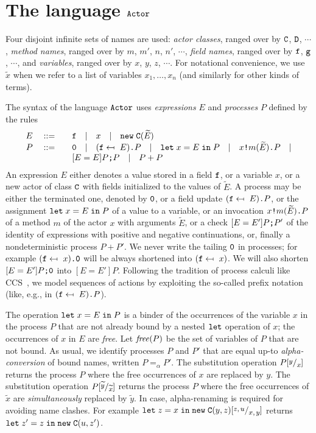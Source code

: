 \documentclass{LMCS}
\theoremstyle{plain}\newtheorem{proposition}[thm]{Proposition}
\theoremstyle{plain}\newtheorem{lemma}[thm]{Lemma}
\theoremstyle{plain}\newtheorem{theorem}[thm]{Theorem}
\theoremstyle{plain}\newtheorem{corollary}[thm]{Corollary}
\newcommand{\subst}[2]{[\raisebox{.5ex}{\footnotesize$#1$}  /
                        \raisebox{-.5ex}{\footnotesize$#2$} ]}
\newcommand{\pinull}{{\tt 0}}
\newcommand{\invk}{\mbox{\tt !}}
\newcommand{\prefix}{\mbox{\tt .}}
\newcommand{\newact}[1]{{\tt new} \; #1}
\newcommand{\letin}[3]{{\tt let} \; #1 = #2 \; {\tt in} \; #3}
\newcommand{\f}{{\tt f}}
\newcommand{\g}{{\tt g}}
\newcommand{\ite}{\mbox{{\tt ;}}}
\newcommand{\upd}{\mapsfrom~}
\newcommand{\free}[1]{{\it free}(#1)}
\newcommand{\wt}[1]{\widetilde{#1}}
\newcommand{\adef}[1]{{\tt #1}}
\newcommand{\actor}{${\tt Actor}$}
\begin{document}
\section{The language {\actor}}
\label{sec.thelanguage}
Four disjoint infinite sets of names are used:
\emph{actor classes}, ranged over by $\adef{C}$, $\adef{D}$, $\cdots$,
\emph{method names}, ranged over by $m$, $m'$, $n$, $n'$, $\cdots$, 
\emph{field names}, ranged over by ${\f}$, ${\g}$, $\cdots$, 
and \emph{variables}, ranged over by $x$, $y$, $z$, $\cdots$.
For notational convenience, we use $\wt{x}$ when we refer to a list of variables $x_1,\dots,x_n$ (and similarly for other kinds of terms).


The syntax of the language {\actor} uses \emph{expressions} $E$ and 
\emph{processes} $P$ defined by the rules
\[
\begin{array}{rl}
E \quad ::=  &   \quad \f \quad |  \quad x \quad | \quad \newact{\adef{C}}(\wt{E})
\\
P \quad ::= & \quad \pinull  \quad | \quad  (\f \upd E) \prefix P 
 \quad | \quad \letin{x}{E}{P}
 \quad | \quad x \invk m(\wt{E}) \prefix P \quad |
 \\  & \quad
[E = E] P \ite P \quad 
|  \quad  P+P 
\end{array}
\]
An expression $E$ either  denotes 
a value stored in a field ${\f}$, or a variable $x$,
or a new actor of class $\adef{C}$ with fields initialized to the values of
$\wt{E}$.
A process may be either the terminated one, denoted by $\pinull$, or a field update 
$({\f} \upd E) \prefix P$, or the assignment $\letin{x}{E}{P}$ of a value to a variable, or an invocation 
$x \invk m(\wt{E}) \prefix P$ of a method $m$ of the actor $x$
with arguments $\wt{E}$, or a check $[E = E'] P \ite P'$ of the identity of 
expressions
with positive and negative continuations, or, finally  a nondeterministic process $P+P'$. 
We never write the tailing $\pinull$ in processes; for example 
$(\f \upd x) \prefix \pinull$ will be always shortened into $(\f \upd x)$.
We will also shorten $[E = E'] P \ite \pinull$ into $[E = E'] P$.
Following the tradition of process calculi like CCS~\cite{Mil89},
we model sequences of actions by exploiting the 
so-called prefix notation (like, e.g., in $(\f \upd E) \prefix P $). 

The operation $\letin{x}{E}{P}$ is a binder of the occurrences of the
variable $x$ in the process $P$ that are not already bound by a nested
${\tt let}$ operation of $x$; the occurrences of $x$ in $E$ are \emph{free}.
Let $\free{P}$ be the set of variables of $P$ that are not bound. 
As usual, we identify processes $P$ and $P'$ that are equal up-to 
\emph{alpha-conversion} of bound names, written $P =_\alpha P'$.
The 
substitution operation $P \subst{y}{x}$ returns the process $P$ where the
free occurrences of $x$ are replaced by $y$. 
The 
substitution operation $P \subst{\wt{y}}{\wt{x}}$ returns the process $P$ where the
free occurrences of $\wt{x}$ are \emph{simultaneously} replaced by $\wt{y}$. In case,
alpha-renaming is required for avoiding name clashes. For example 
$\letin{z}{x}{\newact{\adef{C}}(y,z)}\subst{z,u}{x,y}$ returns
$\letin{z'}{z}{\newact{\adef{C}}(u,z')}$.
\end{document}
